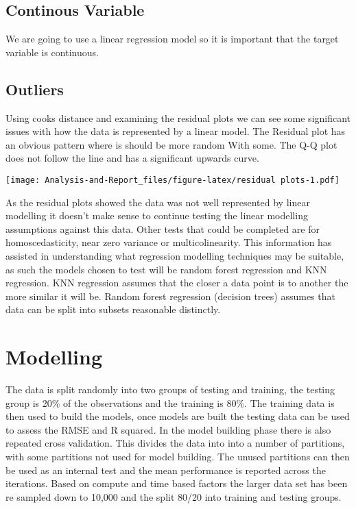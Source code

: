 \documentclass[
]{article}
\begin{document}
\hypertarget{continous-variable}{%
\subsection{Continous Variable}\label{continous-variable}}

We are going to use a linear regression model so it is important that
the target variable is continuous.

\hypertarget{outliers}{%
\subsection{Outliers}\label{outliers}}

Using cooks distance and examining the residual plots we can see some
significant issues with how the data is represented by a linear model.
The Residual plot has an obvious pattern where is should be more random
With some. The Q-Q plot does not follow the line and has a significant
upwards curve.

\texttt{[image: Analysis-and-Report\_files/figure-latex/residual plots-1.pdf]}

As the residual plots showed the data was not well represented by linear
modelling it doesn't make sense to continue testing the linear modelling
assumptions against this data. Other tests that could be completed are
for homoscedasticity, near zero variance or multicolinearity. This
information has assisted in understanding what regression modelling
techniques may be suitable, as such the models chosen to test will be
random forest regression and KNN regression. KNN regression assumes that
the closer a data point is to another the more similar it will be.
Random forest regression (decision trees) assumes that data can be split
into subsets reasonable distinctly.

\hypertarget{modelling}{%
\section{Modelling}\label{modelling}}

The data is split randomly into two groups of testing and training, the
testing group is 20\% of the observations and the training is 80\%. The
training data is then used to build the models, once models are built
the testing data can be used to assess the RMSE and R squared. In the
model building phase there is also repeated cross validation. This
divides the data into into a number of partitions, with some partitions
not used for model building. The unused partitions can then be used as
an internal test and the mean performance is reported across the
iterations. Based on compute and time based factors the larger data set
has been re sampled down to 10,000 and the split 80/20 into training and
testing groups.
\end{document}
